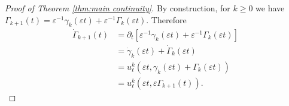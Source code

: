 \documentclass[11pt]{amsart}
\theoremstyle{remark}
\theoremstyle{definition}
\newcommand{\eps}{\varepsilon}
\newcommand{\bracket}[1]{\left[ #1 \right]}
\newcommand{\del}{\partial}
\newcommand{\n}{^{-1}}
\newcommand{\ulow}{u_\ell}
\newcommand{\ulowth}[1]{\ulow^{#1}}
\begin{document}
\begin{proof}[Proof of Theorem \ref{thm:main continuity}]
By construction, for $k \geq 0$ we have $\Gamma_{k+1}(t) = \eps\n \gamma_k(\eps t) + \eps\n \Gamma_k(\eps t)$.  Therefore
\begin{align*} 
\dot{\Gamma}_{k+1}(t) &= \del_t \bracket{\eps\n \gamma_k(\eps t) + \eps\n \Gamma_k(\eps t)}
\\ &= \dot{\gamma}_k(\eps t) + \dot{\Gamma}_k(\eps t)
\\ &= \ulowth{k}(\eps t, \gamma_k(\eps t) + \Gamma_k(\eps t))
\\ &= \ulowth{k}(\eps t, \eps \Gamma_{k+1}(t)).  
\end{align*}

%


\end{proof}
\end{document}

